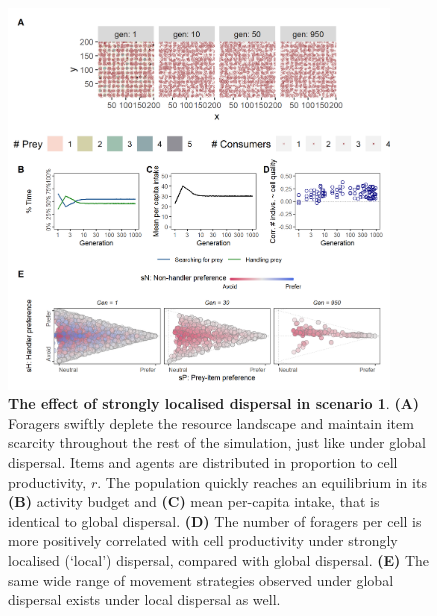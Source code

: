 {\begin{figure}
    \centering
    \includegraphics[width=0.9\textwidth]{figures/kleptomove/fig_local_dispersal_sc_01.png}
    \caption{\textbf{The effect of strongly localised dispersal in scenario 1}. \textbf{(A)} Foragers swiftly deplete the resource landscape and maintain item scarcity throughout the rest of the simulation, just like under global dispersal. Items and agents are distributed in proportion to cell productivity, \(r\). The population quickly reaches an equilibrium in its \textbf{(B)} activity budget and \textbf{(C)} mean per-capita intake, that is identical to global dispersal. \textbf{(D)} The number of foragers per cell is more positively correlated with cell productivity under strongly localised (`local') dispersal, compared with global dispersal. \textbf{(E)} The same wide range of movement strategies observed under global dispersal exists under local dispersal as well.}
\end{figure}

}
